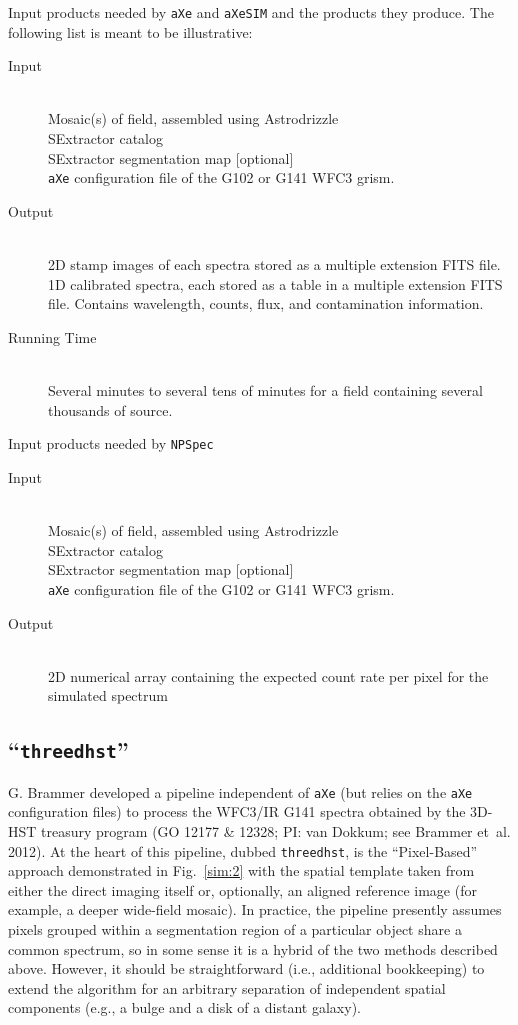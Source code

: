 \documentclass[preprint]{aastex}
\begin{document}
Input products needed by \texttt{aXe} and \texttt{aXeSIM} and the products they produce. The following list is meant to be illustrative:

\begin{description}
\item[Input] \hfill \\
Mosaic(s) of field, assembled using Astrodrizzle\\
SExtractor catalog\\
SExtractor segmentation map [optional]\\
\texttt{aXe} configuration file of the G102 or G141 WFC3 grism.
\item[Output] \hfill \\
2D stamp images of each spectra stored as a multiple extension FITS file.\\
1D calibrated spectra, each stored as a table in a multiple extension FITS file. Contains wavelength, counts, flux, and contamination information.
\item[Running Time] \hfill \\
Several minutes to several tens of minutes for a field containing several thousands of source. 
\end{description}

\centerline{Input products needed by \texttt{NPSpec}}
\begin{description}
\item[Input] \hfill \\
Mosaic(s) of field, assembled using Astrodrizzle\\
SExtractor catalog\\
SExtractor segmentation map [optional]\\
\texttt{aXe} configuration file of the G102 or G141 WFC3 grism.
\item[Output] \hfill \\
2D numerical array containing the expected count rate per pixel for the simulated spectrum

\end{description}

\subsection{``\texttt{threedhst}''}

G. Brammer developed a pipeline independent of \texttt{aXe} (but relies on the \texttt{aXe} configuration files)  to process the WFC3/IR G141 spectra obtained by the 3D-HST treasury program (GO 12177 \& 12328; PI: van Dokkum; see Brammer et~al. 2012).  At the heart of this pipeline, dubbed \texttt{threedhst}, is the ``Pixel-Based'' approach demonstrated in Fig.~\ref{sim:2} with the spatial template taken from either the direct imaging itself or, optionally, an aligned reference image (for example, a deeper wide-field mosaic).  In practice, the pipeline presently assumes pixels grouped within a segmentation region of a particular object share a common spectrum, so in some sense it is a hybrid of the two methods described above.  However, it should be straightforward (i.e., additional bookkeeping) to extend the algorithm for an arbitrary separation of independent spatial components (e.g., a bulge and a disk of a distant galaxy).
\end{document}
